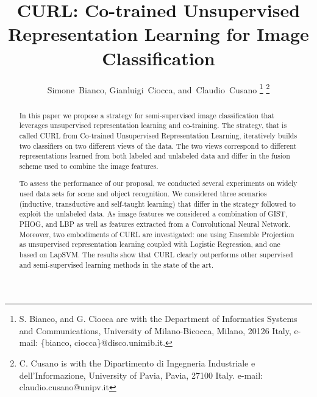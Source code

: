 \documentclass[journal,11pt]{IEEEtran}
\newcommand{\ADD}[1]{#1}
\newcommand{\coso}{strategy}
\newcommand{\emb}{embodiment}
\begin{document}
\title{CURL: Co-trained Unsupervised Representation Learning for Image Classification}

\author{Simone~Bianco,
        Gianluigi~Ciocca,
        and~Claudio~Cusano%
\thanks{S. Bianco, and G. Ciocca are with the Department
of Informatics Systems and Communications, University of Milano-Bicocca, Milano,
20126 Italy, e-mail: \{bianco, ciocca\}@disco.unimib.it.}
\thanks{C. Cusano is with the Dipartimento di Ingegneria Industriale e dell'Informazione, University of Pavia, Pavia, 27100 Italy. e-mail: claudio.cusano@unipv.it}
}



\maketitle

\begin{abstract}
In this paper we propose a \coso{ }for semi-supervised image classification that leverages unsupervised representation learning and co-training. The \coso, that is called CURL from Co-trained Unsupervised Representation Learning, iteratively builds two classifiers on two different views of the data. 
The two views correspond to different representations learned from both labeled and unlabeled data and differ in the fusion scheme used to combine the image features. 

To assess the performance of our proposal, we conducted several experiments on widely used data sets for scene and object recognition.  We considered three scenarios (inductive, transductive  and self-taught learning) that differ in the strategy followed to exploit the unlabeled data. \ADD{As image features we considered a combination of GIST, PHOG, and LBP as well as features extracted from a Convolutional Neural Network. Moreover, two \emb{s} of CURL are investigated: one using Ensemble Projection as unsupervised representation learning coupled with Logistic Regression, and one based on LapSVM.} The results show that CURL clearly outperforms other supervised and semi-supervised learning methods in the state of the art.

\end{abstract}
\end{document}
